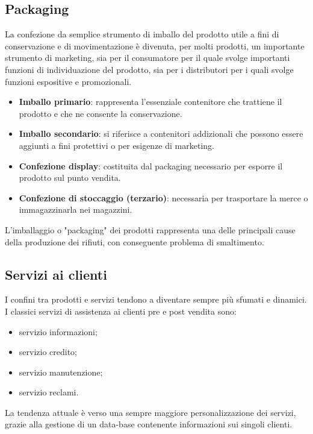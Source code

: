 \subsection{Packaging}
La confezione da semplice strumento di imballo del prodotto utile a fini di conservazione e di movimentazione è divenuta, per molti prodotti, un importante strumento di marketing, sia per il consumatore per il quale svolge importanti funzioni di individuazione del prodotto, sia per i distributori per i quali svolge funzioni espositive e promozionali.
\begin{itemize}
	\item \textbf{Imballo primario}: rappresenta l’essenziale contenitore che trattiene il prodotto e che ne consente la conservazione.
	\item \textbf{Imballo secondario}: si riferisce a contenitori addizionali che possono essere aggiunti a fini protettivi o per esigenze di marketing.
	\item \textbf{Confezione display}: costituita dal packaging necessario per esporre il prodotto sul punto vendita.
	\item \textbf{Confezione di stoccaggio (terzario)}: necessaria per trasportare la merce o immagazzinarla nei magazzini.
\end{itemize}

L'imballaggio o "packaging" dei prodotti rappresenta una delle principali cause della produzione dei rifiuti, con conseguente problema di smaltimento.

\subsection{Servizi ai clienti}
I confini tra prodotti e servizi tendono a diventare sempre più sfumati e dinamici.
I classici servizi di assistenza ai clienti pre e post vendita sono:
\begin{itemize}
	\item servizio informazioni;
	\item servizio credito;
	\item servizio manutenzione;
	\item servizio reclami.
\end{itemize}

La tendenza attuale è verso una sempre maggiore personalizzazione dei servizi, grazie alla gestione di un data-base contenente informazioni sui singoli clienti.

